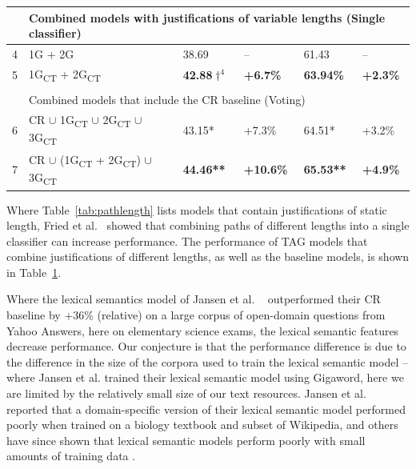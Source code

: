 {\begin{table}[t]
\begin{center}
\begin{tabular}{p{0.3mm}p{55mm}llll}
\\
\hline
& \multicolumn{5}{l}{Combined models with justifications of variable lengths (Single classifier)}\\
\hline
4 & 1G + 2G										& 38.69			& --		& 61.43  	& --  \\
5 & 1G\textsubscript{CT} + 2G\textsubscript{CT} 	& {\bf 42.88$\dagger ^4$}	& {\bf +6.7\%}		& {\bf 63.94\%}  	& {\bf +2.3\%}	  \\

\\
\hline
& \multicolumn{5}{l}{Combined models that include the CR baseline (Voting)}\\
\hline
6 & CR $\cup$ 1G\textsubscript{CT} $\cup$ 2G\textsubscript{CT} $\cup$ 3G\textsubscript{CT} 			& 43.15*			& +7.3\%			& 64.51*		& +3.2\%	  \\
7 & CR $\cup$ (1G\textsubscript{CT} + 2G\textsubscript{CT}) $\cup$ 3G\textsubscript{CT} 			& {\bf 44.46**}		& {\bf +10.6\%}		& {\bf 65.53**} 		& {\bf +4.9\%}	  \\

\hline
\end{tabular}
\label{tab:combinedmodels}
\end{center}
\end{table}

Where Table~\ref{tab:pathlength} lists models that contain justifications of static length, Fried et al.~\citeyear{fried2015higher} showed that combining paths of different lengths into a single classifier can increase performance.  The performance of TAG models that combine justifications of different lengths, as well as the baseline models, is shown in Table~\ref{tab:combinedmodels}.

{} Where the lexical semantics model of Jansen et al. ~\citeyear{jansen14} outperformed their CR baseline by +36\% (relative) on a large corpus of open-domain questions from Yahoo Answers, here on elementary science exams, the lexical semantic features decrease performance.  Our conjecture is that the performance difference is due to the difference in the size of the corpora used to train the lexical semantic model -- where Jansen et al. trained their lexical semantic model using Gigaword, here we are limited by the relatively small size of our text resources.  Jansen et al. ~\citeyear{jansen14} reported that a domain-specific version of their lexical semantic model performed poorly when trained on a biology textbook and subset of Wikipedia, and others have since shown that lexical semantic models perform poorly with small amounts of training data \cite{sharp-EtAl:2015:NAACL-HLT}. 

}

